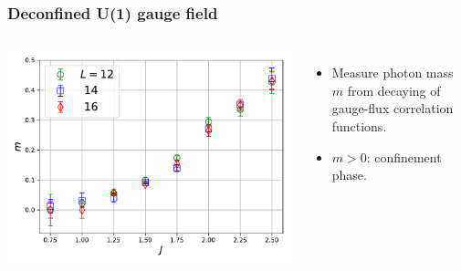 \documentclass[xcolor=table, 10pt, aspectratio=43]{beamer}
\begin{document}
\begin{frame}
  \frametitle{Deconfined U(1) gauge field}
  \begin{columns}
    \includegraphics[width=\textwidth]{../u1sl/photonmass}
		\begin{itemize}
			\item Measure photon mass $m$ from decaying of gauge-flux correlation functions.
			\item $m > 0$: confinement phase.
		\end{itemize}
  \end{columns}
\end{frame}
\end{document}
